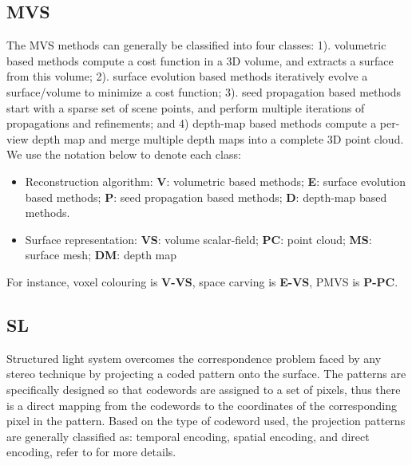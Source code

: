 \subsection{MVS}
The MVS methods can generally be classified into four classes: 1). volumetric based methods compute a cost function in a 3D volume, and extracts a surface from this volume; 2). surface evolution based methods iteratively evolve a surface/volume to minimize a cost function; 3). seed propagation based methods start with a sparse set of scene points, and perform multiple iterations of propagations and refinements; and 4) depth-map based methods compute a per-view depth map and merge multiple depth maps into a complete 3D point cloud. We use the notation below to denote each class:
\begin{itemize}
\item Reconstruction algorithm: \textbf{V}: volumetric based methods; \textbf{E}: surface evolution based methods; \textbf{P}: seed propagation based methods; \textbf{D}: depth-map based methods.
\item Surface representation: \textbf{VS}: volume scalar-field; \textbf{PC}: point cloud; \textbf{MS}: surface mesh; \textbf{DM}: depth map
\end{itemize}

For instance, voxel colouring is \textbf{V-VS}, space carving is \textbf{E-VS}, PMVS is \textbf{P-PC}.

\subsection{SL}
Structured light system overcomes the correspondence problem faced by any stereo technique by projecting a coded pattern onto the surface. The patterns are specifically designed so that codewords are assigned to a set of pixels, thus there is a direct mapping from the codewords to the coordinates of the corresponding pixel in the pattern. Based on the type of codeword used, the projection patterns are generally classified as: temporal encoding, spatial encoding, and direct encoding, refer to \cite{salvi2004pattern} for more details.


